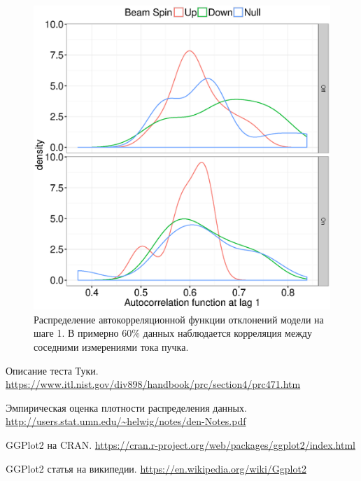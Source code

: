 \documentclass{article}
\begin{document}
	\begin{figure}[h!]
		\centering
		\includegraphics[scale=.7]{ACF1_dens.eps}
		\caption{Распределение автокорреляционной функции отклонений модели на шаге 1. В примерно 60\% данных наблюдается корреляция между соседними измерениями тока пучка.\label{fig:DW2}}
	\end{figure}

	\begin{thebibliography}{9}
		Описание теста Туки. \url{https://www.itl.nist.gov/div898/handbook/prc/section4/prc471.htm}
		
		Эмпирическая оценка плотности распределения данных. \url{http://users.stat.umn.edu/~helwig/notes/den-Notes.pdf}
		
		GGPlot2 на CRAN. \url{https://cran.r-project.org/web/packages/ggplot2/index.html}
		
		GGPlot2 статья на википедии. \url{https://en.wikipedia.org/wiki/Ggplot2}
	\end{thebibliography}
	
\end{document}
